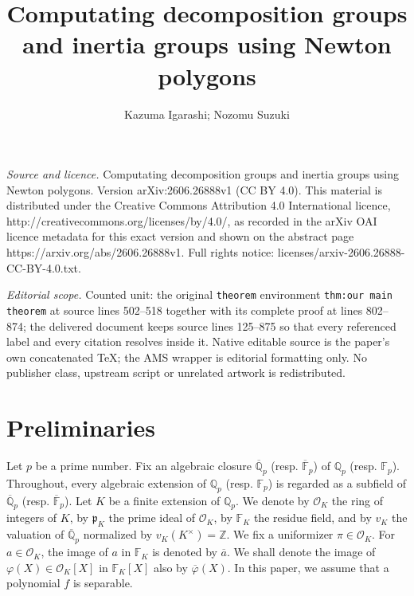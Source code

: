 \documentclass[10pt,a4paper]{amsart}
\newcommand{\field}[1]{\mathbb{#1}}
\newcommand{\Z}{\field{Z}}
\newcommand{\Q}{\field{Q}}
\numberwithin{equation}{section}
\begin{document}
\title[Computating decomposition groups and inertia groups using Ne]{Computating decomposition groups and inertia groups using Newton polygons}
\author{Kazuma Igarashi; Nozomu Suzuki}
\date{}
\maketitle
\noindent\emph{Source and licence.} Computating decomposition groups and inertia groups using Newton polygons. Version arXiv:2606.26888v1 (CC BY 4.0). This material is distributed under the Creative Commons Attribution 4.0 International licence, http://creativecommons.org/licenses/by/4.0/, as recorded in the arXiv OAI licence metadata for this exact version and shown on the abstract page https://arxiv.org/abs/2606.26888v1. Full rights notice: licenses/arxiv-2606.26888-CC-BY-4.0.txt.\par\smallskip
\noindent\textit{Editorial scope.} Counted unit: the original \texttt{theorem} environment \texttt{thm:our main theorem} at source lines 502--518 together with its complete proof at lines 802--874; the delivered document keeps source lines 125--875 so that every referenced label and every citation resolves inside it. Native editable source is the paper's own concatenated TeX; the AMS wrapper is editorial formatting only. No publisher class, upstream script or unrelated artwork is redistributed.
\section{Preliminaries}\label{sec:Prelim}

  Let $p$ be a prime number. Fix an algebraic closure $\overline{\Q}_p$ (resp. $\overline{\field{F}}_p$) of $\field{Q}_p$ (resp. $\field{F}_p$). 
  Throughout, every algebraic extension of $\field{Q}_p$ (resp. $\field{F}_p$) is 
  regarded as a subfield of $\overline{\field{Q}}_p$ (resp. $\overline{\field{F}}_p$). 
  Let $K$ be a finite extension of $\field{Q}_p$. We denote by $\mathcal{O}_K$ the ring of integers of $K$, 
  by $\mathfrak{p}_K$ the prime ideal of $\mathcal{O}_K$, by $\field{F}_K$ the residue field, and by $v_K$ the valuation of $\overline{\Q}_p$ 
  normalized by $v_K(K^{\times}) = \Z$. 
  We fix a uniformizer $\pi \in \mathcal{O}_K$. 
  For $a \in \mathcal{O}_K$, the image of $a$ in $\field{F}_K$ is denoted by $\overline{a}$. 
  We shall denote the image of $\varphi(X) \in \mathcal{O}_K [X]$ in $\field{F}_K [X]$ also by $\overline{\varphi}(X)$. 
  In this paper, we assume that a polynomial $f$ is separable.
\end{document}
